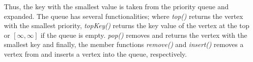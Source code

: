 \documentclass[10pt,journal]{IEEEtran}
\begin{document}
Thus, the key with the smallest value is taken from the priority queue and expanded. The queue has several functionalities; where \textit{top()} returns the vertex with the smallest priority, \textit{topKey()} returns the key value of the vertex at the top or $[\infty, \infty]$ if the queue is empty. \textit{pop()} removes and returns the vertex with the smallest key and finally, the member functions \textit{remove()} and \textit{insert()} removes a vertex from and inserts a vertex into the queue, respectively.

%
\end{document}
